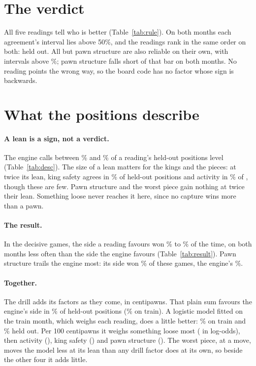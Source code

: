 \documentclass[11pt]{article}
\begin{document}
\section{The verdict}

\RuleTable

All five readings tell who is better (Table~\ref{tab:rule}). On both months each agreement's
interval lies above 50\%, and the readings rank in the same order on both: \Ranked{} held out.
All but pawn structure are also reliable on their own, with intervals above \ReliablePct\%;
pawn structure falls short of that bar on both months. No reading points the wrong way, so the
board code has no factor whose sign is backwards.

\section{What the positions describe}

\DescTable

\paragraph{A lean is a sign, not a verdict.} The engine calls between \LevelMin\% and
\LevelMax\% of a reading's held-out positions level (Table~\ref{tab:desc}). The size of a lean
matters for the kings and the pieces: at twice its lean, king safety agrees in
\KingTwiceHeld\% of \KingTwiceHeldN{} held-out positions and activity in \ActivityTwiceHeld\% of
\ActivityTwiceHeldN, though these are few. Pawn structure and the worst piece gain nothing at
twice their lean. Something loose never reaches it here, since no capture wins more than a pawn.

\ResultTable

\paragraph{The result.} In the decisive games, the side a reading favours won \WonMin\% to
\WonMax\% of the time, on both months less often than the side the engine favours
(Table~\ref{tab:result}). Pawn structure trails the engine most: its side won \StructureWon\% of
these games, the engine's \StructureEngineWon\%.

\paragraph{Together.} The drill adds its factors as they come, in centipawns. That plain sum
favours the engine's side in \SumHeld\% of \SumHeldN{} held-out positions (\SumTrain\% on
train). A logistic model fitted on the train month, which weighs each reading, does a little
better: \LogTrain\% on train and \LogHeld\% held out. Per 100 centipawns it weighs something
loose most (\LooseWeight{} in log-odds), then activity (\ActivityWeight), king safety
(\KingWeight) and pawn structure (\StructureWeight). The worst piece, at \WorstWeight{} a move,
moves the model less at its lean than any drill factor does at its own, so beside the other four
it adds little.
\end{document}
